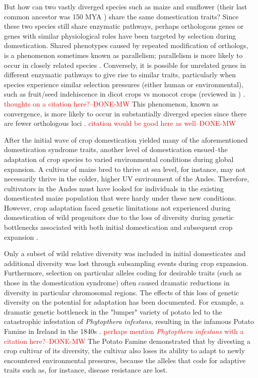 \documentclass[12pt]{article}
\newcommand{\mbh}[1]{\textcolor{red}{\normalsize  #1}}
\begin{document}
But how can two vastly diverged species such as maize and sunflower  (their last common ancestor was 150 MYA \citep{Chang2004}) share the same domestication traits? 
Since these two species still share enzymatic pathways, perhaps orthologous genes or genes with similar physiological roles have been targeted by selection during domestication.
Shared phenotypes caused by repeated modification of orthologs, is a phenomenon sometimes known as parallelism; parallelism is more likely to occur in closely related species \citep{Pickersgill2018}.
Conversely, it is possible for unrelated genes in different enzymatic pathways to give rise to similar traits, particularly when species experience similar selection pressures (either human or environmental), such as fruit/seed indehiscence in dicot crops vs monocot crops (reviewed in \citep{Dong2015}) . \mbh{thoughts on a citation here?--DONE-MW}
This phenomenon, known as convergence, is more likely to occur in substantially diverged species since there are fewer orthologous loci \citep{Washburn2016, Pickersgill2018}. \mbh{citation would be good here as well--DONE-MW}

After the initial wave of crop domestication yielded many of the aforementioned domestication syndrome traits, another level of domestication ensued--the adaptation of crop species to varied environmental conditions during global expansion.
A cultivar of maize bred to thrive at sea level, for instance, may not necessarily thrive in the colder, higher UV environment of the Andes.
Therefore, cultivators in the Andes must have looked for individuals in the existing domesticated maize population that were hardy under these new conditions.
However, crop adaptation faced genetic limitations not experienced during domestication of wild progenitors due to the loss of diversity during genetic bottlenecks associated with both initial domestication and subsequent crop expansion \cite{Wang2017}. 

Only a subset of wild relative diversity was included in initial domesticates and additional diversity was lost through subsampling events during crop expansion.
Furthermore, selection on particular alleles coding for desirable traits (such as those in the domestication syndrome) often caused dramatic reductions in diversity in particular chromosomal regions.
The effects of this loss of genetic diversity on the potential for adaptation has been documented.
For example, a dramatic genetic bottleneck in the "lumper" variety of potato led to the catastrophic infestation of \emph{Phytopthera infestans}, resulting in the infamous Potato Famine in Ireland in the 1840s \citep{Goodwin1994}. \mbh{perhaps mention \emph{Phytopthera infestans} with a citation here?--DONE-MW}
The Potato Famine demonstrated that by divesting a crop cultivar of its diversity, the cultivar also loses its ability to adapt to newly encountered environmental pressures, because the alleles that code for adaptive traits such as, for instance, disease resistance are lost.
\end{document}

